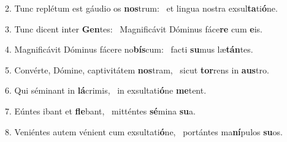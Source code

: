 2. Tunc replétum est gáudio os \textbf{nos}trum: \ast\  et lingua nostra exsul\textbf{ta}ti\textbf{ó}ne.\

3. Tunc dicent inter \textbf{Gen}tes: \ast\  Magnificávit Dóminus fáce\textbf{re} cum \textbf{e}is.\

4. Magnificávit Dóminus fácere no\textbf{bís}cum: \ast\  facti \textbf{su}mus læ\textbf{tán}tes.\

5. Convérte, Dómine, captivitátem \textbf{nos}tram, \ast\  sicut \textbf{tor}rens in \textbf{aus}tro.\

6. Qui séminant in \textbf{lá}crimis, \ast\  in exsultati\textbf{ó}ne \textbf{me}tent.\

7. Eúntes ibant et \textbf{fle}bant, \ast\  mitténtes \textbf{sé}mina \textbf{su}a.\

8. Veniéntes autem vénient cum exsultati\textbf{ó}ne, \ast\  portántes ma\textbf{ní}pulos \textbf{su}os.\

